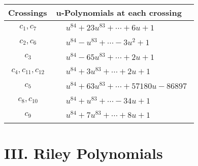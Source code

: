 \documentclass[1p]{elsarticle_modified}
\theoremstyle{definition}
\begin{document}
\begin{tabular}{m{50pt}|m{274pt}}
Crossings & \hspace{64pt}u-Polynomials at each crossing \\
\hline $$\begin{aligned}c_{1},c_{7}\end{aligned}$$&$\begin{aligned}
&u^{84}+23 u^{83}+\cdots+6 u+1
\end{aligned}$\\
\hline $$\begin{aligned}c_{2},c_{6}\end{aligned}$$&$\begin{aligned}
&u^{84}- u^{83}+\cdots-3 u^2+1
\end{aligned}$\\
\hline $$\begin{aligned}c_{3}\end{aligned}$$&$\begin{aligned}
&u^{84}-65 u^{83}+\cdots+2 u+1
\end{aligned}$\\
\hline $$\begin{aligned}c_{4},c_{11},c_{12}\end{aligned}$$&$\begin{aligned}
&u^{84}+3 u^{83}+\cdots+2 u+1
\end{aligned}$\\
\hline $$\begin{aligned}c_{5}\end{aligned}$$&$\begin{aligned}
&u^{84}+63 u^{83}+\cdots+57180 u-86897
\end{aligned}$\\
\hline $$\begin{aligned}c_{8},c_{10}\end{aligned}$$&$\begin{aligned}
&u^{84}+u^{83}+\cdots-34 u+1
\end{aligned}$\\
\hline $$\begin{aligned}c_{9}\end{aligned}$$&$\begin{aligned}
&u^{84}+7 u^{83}+\cdots+8 u+1
\end{aligned}$\\
\hline
\end{tabular}\newpage\renewcommand{\arraystretch}{1}
\centering \section*{ III. Riley Polynomials}
\end{document}
